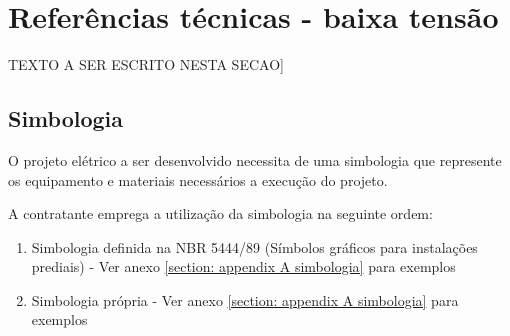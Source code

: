 \section{Referências técnicas - baixa tensão} \label{section: tech references}
TEXTO A SER ESCRITO NESTA SECAO]

\subsection{Simbologia}
O projeto elétrico a ser desenvolvido necessita de uma simbologia que represente os equipamento e materiais necessários a execução do projeto.

A contratante emprega a utilização da simbologia na seguinte ordem:
\begin{enumerate}
	\item Simbologia definida na NBR 5444/89 (Símbolos gráficos para instalações prediais) - Ver anexo \ref{section: appendix A simbologia} para exemplos 
	
	\item Simbologia própria - Ver anexo \ref{section: appendix A simbologia} para exemplos
\end{enumerate}
